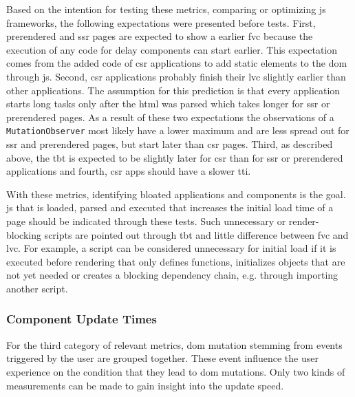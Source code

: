 \documentclass[a4paper, 12pt]{article}
\begin{document}
Based on the intention for testing these metrics, comparing or optimizing \acrlong{js} frameworks, the following expectations were presented before tests.
First, prerendered and \acrshort{ssr} pages are expected to show a earlier \acrshort{fvc} because the execution of any code for delay components can start earlier.
This expectation comes from the added code of \acrshort{csr} applications to add static elements to the \acrshort{dom} through \acrshort{js}.
Second, \acrshort{csr} applications probably finish their \acrshort{lvc} slightly earlier than other applications.
The assumption for this prediction is that every application starts long tasks only after the \acrshort{html} was parsed which takes longer for \acrshort{ssr} or prerendered pages.
As a result of these two expectations the observations of a \verb|MutationObserver| most likely have a lower maximum and are less spread out for \acrshort{ssr} and prerendered pages, but start later than \acrshort{csr} pages.
Third, as described above, the \acrshort{tbt} is expected to be slightly later for \acrshort{csr} than for \acrshort{ssr} or prerendered applications and fourth, \acrshort{csr} apps should have a slower \acrshort{tti}.

With these metrics, identifying bloated applications and components is the goal.
\acrlong{js} that is loaded, parsed and executed that increases the initial load time of a page should be indicated through these tests.
Such unnecessary or render-blocking scripts are pointed out through \acrshort{tbt} and little difference between \acrshort{fvc} and \acrshort{lvc}.
For example, a script can be considered unnecessary for initial load if it is executed before rendering that only defines functions, initializes objects that are not yet needed or creates a blocking dependency chain, e.g. through importing another script.

\subsubsection{Component Update Times}\label{subsub:componentUpdateTimes}
% 

For the third category of relevant metrics, \acrshort{dom} mutation stemming from events triggered by the user are grouped together.
These event influence the user experience on the condition that they lead to \acrshort{dom} mutations.
Only two kinds of measurements can be made to gain insight into the update speed.
\end{document}
